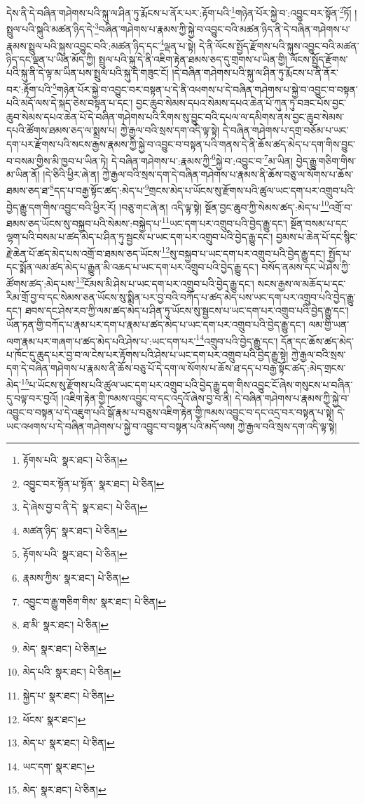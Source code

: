 དེས་ནི་དེ་བཞིན་གཤེགས་པའི་སྐུ་ལ་ཤིན་ཏུ་རྨོངས་པ་ནོར་པར་:རྟོག་པའི་\footnote{རྟོགས་པའི་  སྣར་ཐང་།  པེ་ཅིན། }གཉེན་པོར་སྐྱེ་བ་:འབྱུང་བར་སྟོན་\footnote{འབྱུང་བར་སྟོན་པ་སྟོན་  སྣར་ཐང་།  པེ་ཅིན། }ཏོ། །སྤྲུལ་པའི་སྐུའི་མཚན་ཉིད་དེ་\footnote{དེ་ཞེས་བྱ་བ་ནི་དེ་  སྣར་ཐང་།  པེ་ཅིན། }བཞིན་གཤེགས་པ་རྣམས་ཀྱི་སྐྱེ་བ་འབྱུང་བའི་མཚན་ཉིད་ནི་དེ་བཞིན་གཤེགས་པ་རྣམས་སྤྲུལ་པའི་སྐུས་འབྱུང་བའི་:མཚན་ཉིད་དང་\footnote{མཚན་ཉིད་  སྣར་ཐང་།  པེ་ཅིན། }ལྡན་པ་སྟེ། དེ་ནི་ལོངས་སྤྱོད་རྫོགས་པའི་སྐུས་འབྱུང་བའི་མཚན་ཉིད་དང་ལྡན་པ་ཡིན་མོད་ཀྱི། སྤྲུལ་པའི་སྐུ་དེ་ནི་འཇིག་རྟེན་ཐམས་ཅད་དུ་གྲགས་པ་ཡིན་གྱི། ལོངས་སྤྱོད་རྫོགས་པའི་སྐུ་ནི་དེ་ལྟ་མ་ཡིན་པས་སྤྲུལ་པའི་སྐུ་དེ་གཟུང་ངོ། །དེ་བཞིན་གཤེགས་པའི་སྐུ་ལ་ཤིན་ཏུ་རྨོངས་པ་ནི་ནོར་བར་:རྟོག་པའི་\footnote{རྟོགས་པའི་  སྣར་ཐང་།  པེ་ཅིན། }གཉེན་པོར་སྐྱེ་བ་འབྱུང་བར་བསྟན་པ་དེ་ནི་འཕགས་པ་དེ་བཞིན་གཤེགས་པ་སྐྱེ་བ་འབྱུང་བ་བསྟན་པའི་མདོ་ལས་དེ་སྐད་ཅེས་བསྟན་པ་དང་། བྱང་ཆུབ་སེམས་དཔའ་སེམས་དཔའ་ཆེན་པོ་ཀུན་ཏུ་བཟང་པོས་བྱང་ཆུབ་སེམས་དཔའ་ཆེན་པོ་དེ་བཞིན་གཤེགས་པའི་རིགས་སུ་བྱུང་བའི་དཔལ་ལ་དམིགས་ནས་བྱང་ཆུབ་སེམས་དཔའི་ཚོགས་ཐམས་ཅད་ལ་སྨྲས་པ། ཀྱེ་རྒྱལ་བའི་སྲས་དག་འདི་ལྟ་སྟེ། དེ་བཞིན་གཤེགས་པ་དགྲ་བཅོམ་པ་ཡང་དག་པར་རྫོགས་པའི་སངས་རྒྱས་རྣམས་ཀྱི་སྐྱེ་བ་འབྱུང་བ་བསྟན་པའི་གནས་དེ་ནི་ཆོས་ཚད་མེད་པ་དག་གིས་བྱུང་བ་བསམ་གྱིས་མི་ཁྱབ་པ་ཡིན་ཏེ། དེ་བཞིན་གཤེགས་པ་:རྣམས་ཀྱི་\footnote{རྣམས་ཀྱིས་  སྣར་ཐང་།  པེ་ཅིན། }སྐྱེ་བ་:འབྱུང་བ་\footnote{འབྱུང་བ་རྒྱུ་གཅིག་གིས་  སྣར་ཐང་།  པེ་ཅིན། }མ་ཡིན། བྱེད་རྒྱུ་གཅིག་གིས་མ་ཡིན་ནོ། །དེ་ཅིའི་ཕྱིར་ཞེ་ན། ཀྱེ་རྒྱལ་བའི་སྲས་དག་དེ་བཞིན་གཤེགས་པ་རྣམས་ནི་ཆོས་བཅུ་ལ་སོགས་པ་ཆོས་ཐམས་ཅད་ཐ་\footnote{ཐ་མི་  སྣར་ཐང་།  པེ་ཅིན། }དད་པ་བརྒྱ་སྟོང་ཚད་:མེད་པ་\footnote{མེད་  སྣར་ཐང་།  པེ་ཅིན། }གྲངས་མེད་པ་ཡོངས་སུ་རྫོགས་པའི་ཚུལ་ཡང་དག་པར་འགྲུབ་པའི་བྱེད་རྒྱུ་དག་གིས་འབྱུང་བའི་ཕྱིར་རོ། །བཅུ་གང་ཞེ་ན། འདི་ལྟ་སྟེ། སྔོན་བྱང་ཆུབ་ཀྱི་སེམས་ཚད་:མེད་པ་\footnote{མེད་པའི་  སྣར་ཐང་།  པེ་ཅིན། }འགྲོ་བ་ཐམས་ཅད་ཡོངས་སུ་བསྐྱབ་པའི་སེམས་:བསྐྱེད་པ་\footnote{སྐྱེད་པ་  སྣར་ཐང་།  པེ་ཅིན། }ཡང་དག་པར་འགྲུབ་པའི་བྱེད་རྒྱུ་དང་། སྔོན་བསམ་པ་དང་ལྷག་པའི་བསམ་པ་ཚད་མེད་པ་ཤིན་ཏུ་སྦྱངས་པ་ཡང་དག་པར་འགྲུབ་པའི་བྱེད་རྒྱུ་དང་། བྱམས་པ་ཆེན་པོ་དང་སྙིང་རྗེ་ཆེན་པོ་ཚད་མེད་པས་འགྲོ་བ་ཐམས་ཅད་ཡོངས་\footnote{ཕོངས་  སྣར་ཐང་། }སུ་བསྐྱབ་པ་ཡང་དག་པར་འགྲུབ་པའི་བྱེད་རྒྱུ་དང་། སྤྱོད་པ་དང་སྨོན་ལམ་ཚད་མེད་པ་རྒྱུན་མི་འཆད་པ་ཡང་དག་པར་འགྲུབ་པའི་བྱེད་རྒྱུ་དང་། བསོད་ནམས་དང་ཡེ་ཤེས་ཀྱི་ཚོགས་ཚད་:མེད་པས་\footnote{མེད་པ་  སྣར་ཐང་།  པེ་ཅིན། }ངོམས་མི་ཤེས་པ་ཡང་དག་པར་འགྲུབ་པའི་བྱེད་རྒྱུ་དང་། སངས་རྒྱས་ལ་མཆོད་པ་དང་རིམ་གྲོ་བྱ་བ་དང་སེམས་ཅན་ཡོངས་སུ་སྨིན་པར་བྱ་བའི་བཀོད་པ་ཚད་མེད་པས་ཡང་དག་པར་འགྲུབ་པའི་བྱེད་རྒྱུ་དང་། ཐབས་དང་ཤེས་རབ་ཀྱི་ལམ་ཚད་མེད་པ་ཤིན་ཏུ་ཡོངས་སུ་སྦྱངས་པ་ཡང་དག་པར་འགྲུབ་པའི་བྱེད་རྒྱུ་དང་། ཡོན་ཏན་གྱི་བཀོད་པ་རྣམ་པར་དག་པ་རྣམ་པ་ཚད་མེད་པ་ཡང་དག་པར་འགྲུབ་པའི་བྱེད་རྒྱུ་དང་། ལམ་གྱི་ཡན་ལག་རྣམ་པར་གཞག་པ་ཚད་མེད་པའི་ཤེས་པ་:ཡང་དག་པར་\footnote{ཡང་དག་  སྣར་ཐང་། }འགྲུབ་པའི་བྱེད་རྒྱུ་དང་། དོན་དང་ཆོས་ཚད་མེད་པ་ཁོང་དུ་ཆུད་པར་བྱ་བ་ལ་ངེས་པར་རྟོགས་པའི་ཤེས་པ་ཡང་དག་པར་འགྲུབ་པའི་བྱེད་རྒྱུ་སྟེ། ཀྱེ་རྒྱལ་བའི་སྲས་དག་དེ་བཞིན་གཤེགས་པ་རྣམས་ནི་ཆོས་བཅུ་པོ་དེ་དག་ལ་སོགས་པ་ཆོས་ཐ་དད་པ་བརྒྱ་སྟོང་ཚད་:མེད་གྲངས་མེད་\footnote{མེད་  སྣར་ཐང་།  པེ་ཅིན། }པ་ཡོངས་སུ་རྫོགས་པའི་ཚུལ་ཡང་དག་པར་འགྲུབ་པའི་བྱེད་རྒྱུ་དག་གིས་འབྱུང་ངོ་ཞེས་གསུངས་པ་བཞིན་དུ་བལྟ་བར་བྱའོ། །འཇིག་རྟེན་གྱི་ཁམས་འབྱུང་བ་དང་འདྲའོ་ཞེས་བྱ་བ་ནི། དེ་བཞིན་གཤེགས་པ་རྣམས་ཀྱི་སྐྱེ་བ་འབྱུང་བ་བསྟན་པ་དེ་འཇུག་པའི་སྒོ་རྣམ་པ་བཅུས་འཇིག་རྟེན་གྱི་ཁམས་འབྱུང་བ་དང་འདྲ་བར་བསྟན་པ་སྟེ། དེ་ཡང་འཕགས་པ་དེ་བཞིན་གཤེགས་པ་སྐྱེ་བ་འབྱུང་བ་བསྟན་པའི་མདོ་ལས། ཀྱེ་རྒྱལ་བའི་སྲས་དག་འདི་ལྟ་སྟེ། 
